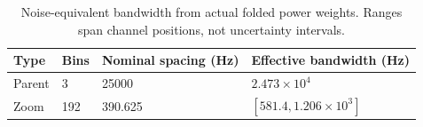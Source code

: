 \begin{table}[htbp]
\centering\small
\caption{Noise-equivalent bandwidth from actual folded power weights. Ranges span channel positions, not uncertainty intervals.}
\label{tab:channels}
\begin{tabular}{llll}
\toprule
Type & Bins & Nominal spacing (Hz) & Effective bandwidth (Hz)\\
\midrule
Parent & 3 & 25000 & $2.473\times10^{4}$\\
Zoom & 192 & 390.625 & $[581.4,1.206\times10^{3}]$\\
\bottomrule
\end{tabular}
\end{table}
